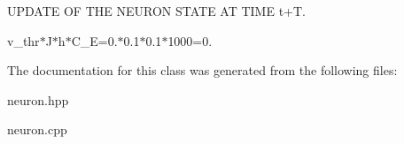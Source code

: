 U\-P\-D\-A\-T\-E O\-F T\-H\-E N\-E\-U\-R\-O\-N S\-T\-A\-T\-E A\-T T\-I\-M\-E t+\-T. 

v\-\_\-thr$\ast$\-J$\ast$h$\ast$\-C\-\_\-\-E=0.$\ast$0.1$\ast$0.1$\ast$1000=0. 

The documentation for this class was generated from the following files\-:\begin{DoxyCompactItemize}
\item 
neuron.\-hpp\item 
neuron.\-cpp\end{DoxyCompactItemize}
